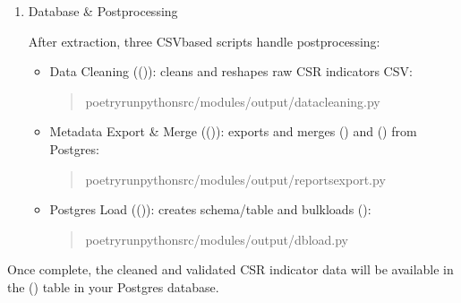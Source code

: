 \documentclass[letterpaper,10pt,english]{sphinxmanual}
\begin{document}
\begin{enumerate}
\item {} 
\sphinxAtStartPar
Database \& Post\sphinxhyphen{}processing

\sphinxAtStartPar
After extraction, three CSV\sphinxhyphen{}based scripts handle post\sphinxhyphen{}processing:
\begin{itemize}
\item {} 
\sphinxAtStartPar
Data Cleaning (()): cleans and reshapes raw CSR indicators CSV:
\begin{quote}

\begin{sphinxVerbatim}[commandchars=\\\{\}]
poetryrunpythonsrc/modules/output/data\PYGZus{}cleaning.py
\end{sphinxVerbatim}
\end{quote}

\item {} 
\sphinxAtStartPar
Metadata Export \& Merge (()): exports and merges () and () from Postgres:
\begin{quote}

\begin{sphinxVerbatim}[commandchars=\\\{\}]
poetryrunpythonsrc/modules/output/reports\PYGZus{}export.py
\end{sphinxVerbatim}
\end{quote}

\item {} 
\sphinxAtStartPar
Postgres Load (()): creates schema/table and bulk\sphinxhyphen{}loads ():
\begin{quote}

\begin{sphinxVerbatim}[commandchars=\\\{\}]
poetryrunpythonsrc/modules/output/db\PYGZus{}load.py
\end{sphinxVerbatim}
\end{quote}

\end{itemize}

\end{enumerate}

\sphinxAtStartPar
Once complete, the cleaned and validated CSR indicator data will be available in the () table in your Postgres database.
\end{document}
